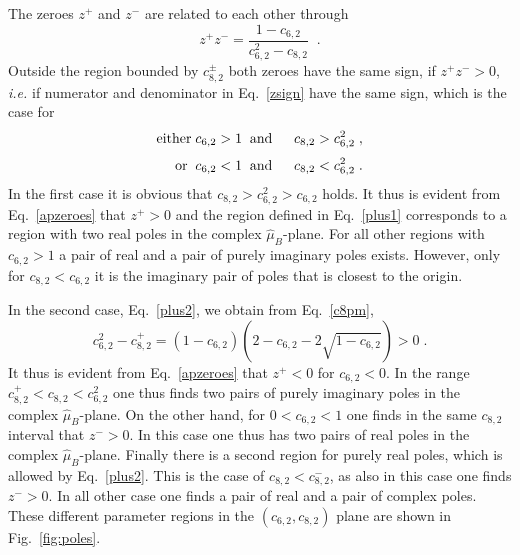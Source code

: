 \documentclass[pdflatex,prd,twocolumn,showpacs,superscriptaddress,nofootinbib]{revtex4-1}
\newcommand \hmu {\hat{\mu}}
\begin{document}
The zeroes $z^+$ and $z^-$ are related to each other through
\begin{equation}
    z^+ z^- = \frac{1-c_{6,2}}{c_{6,2}^2 - c_{8,2}}
    \;\; .
    \label{zsign}
\end{equation}
Outside the region bounded by $c_{8,2}^\pm$ both zeroes have the same sign,
if $z^+ z^- >0$, {\it i.e.} if
numerator and denominator in
Eq.~\ref{zsign} have the same sign, which is the case for
\begin{eqnarray}
   {\rm either}\; c_{6,2} > 1  &\;\;{\rm and}\;\;& c_{8,2} > c_{6,2}^2 \; , \label{plus1} \\[1mm]
   {\rm or}\;\; 
   c_{6,2} < 1 &\;\;{\rm and}\;\;& c_{8,2} <
   c_{6,2}^2\; . \label{plus2}
\end{eqnarray}
In the first case it is obvious that
$c_{8,2} > c_{6,2}^2 >c_{6,2}$ holds.
It thus is evident from Eq.~\ref{apzeroes} that $z^+ >0$ and the region defined in Eq.~\ref{plus1} corresponds to a region with two real poles in
the complex $\hmu_B$-plane. For all other regions 
with $c_{6,2} >1$ a pair of real and a pair of purely 
imaginary poles exists. However, only for $c_{8,2} < c_{6,2}$ it is the imaginary pair of poles that is closest to the origin.

In the second case, Eq.~\ref{plus2}, we obtain from Eq.~\ref{c8pm},  
\begin{equation}
 c_{6,2}^2 - c_{8,2}^+ =  (1-c_{6,2}) (2- c_{6,2} -2 \sqrt{1-c_{6,2}}) > 0\; .
\end{equation}
It thus is evident from Eq.~\ref{apzeroes}
that $z^+<0$ for $c_{6,2}<0$. In the range
$c_{8,2}^+<c_{8,2}<c_{6,2}^2$ one thus finds
two pairs of purely imaginary poles in the
complex $\hmu_B$-plane. On the other hand,
for $0<c_{6,2}<1$ one finds in the same $c_{8,2}$ interval that $z^->0$. In this case
one thus has two pairs of real poles in the
complex $\hmu_B$-plane.
Finally there is a second region for purely 
real poles, which is allowed by Eq.~\ref{plus2}. This is the case of $c_{8,2}<c_{8,2}^-$, as  also in this case one finds $z^->0$. 
In all other case one finds a pair of real and
a pair of complex poles. These different parameter regions in the $(c_{6,2},c_{8,2})$
plane are shown in Fig.~\ref{fig:poles}.
\end{document}

